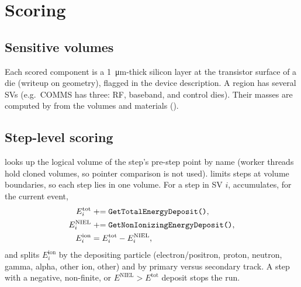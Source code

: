 
\section{Scoring}

\subsection{Sensitive volumes}
Each scored component is a \SI{1}{\micro m}-thick silicon layer at the transistor surface of a die (writeup on geometry), flagged  in the device description. A region has several SVs (e.g.\ COMMS has three: RF, baseband, and control dies). Their masses are computed by \gfour{} from the volumes and materials ().

\subsection{Step-level scoring}
 looks up the logical volume of the step's pre-step point by name (worker threads hold cloned volumes, so pointer comparison is not used). \gfour{} limits steps at volume boundaries, so each step lies in one volume. For a step in SV $i$,  accumulates, for the current event,
\begin{align}
  E^{\text{tot}}_i &\mathrel{+}= \text{\code{GetTotalEnergyDeposit()}},\\
  E^{\text{NIEL}}_i &\mathrel{+}= \text{\code{GetNonIonizingEnergyDeposit()}},\\
  E^{\text{ion}}_i &= E^{\text{tot}}_i - E^{\text{NIEL}}_i,
\end{align}
and splits $E^{\text{ion}}_i$ by the depositing particle (electron/positron, proton, neutron, gamma, alpha, other ion, other) and by primary versus secondary track. A step with a negative, non-finite, or $E^{\text{NIEL}}>E^{\text{tot}}$ deposit stops the run.

